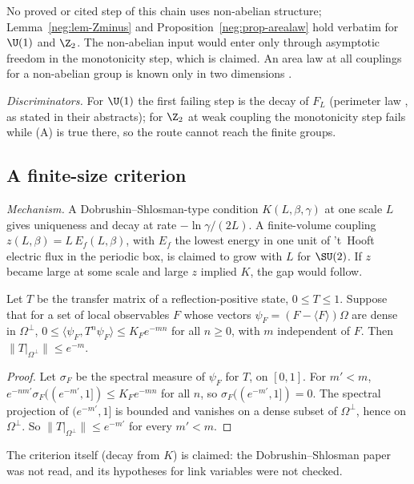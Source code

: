 No proved or cited step of this chain uses non-abelian structure; Lemma~\ref{neg:lem-Zminus}
and Proposition~\ref{neg:prop-arealaw} hold verbatim for $\U(1)$ and $\Z_2$. The non-abelian
input would enter only through asymptotic freedom in the monotonicity step, which is claimed.
An area law at all couplings for a non-abelian group is known only in two dimensions
\cite[p.~8]{Ch18}.

\emph{Discriminators.} For $\U(1)$ the first failing step is the decay of $F_L$ (perimeter law
\cite{Guth80,FS82}, as stated in their abstracts); for $\Z_2$ at weak coupling the monotonicity
step fails while (A) is true there, so the route cannot reach the finite groups.

\subsection{A finite-size criterion}\label{neg:sub-fs}

\emph{Mechanism.} A Dobrushin--Shlosman-type condition $K(L,\beta,\gamma)$ at one scale $L$
gives uniqueness and decay at rate $-\ln\gamma/(2L)$. A finite-volume coupling
$z(L,\beta)=L\,E_f(L,\beta)$, with $E_f$ the lowest energy in one unit of 't~Hooft electric flux
in the periodic box, is claimed to grow with $L$ for $\SU(2)$. If $z$ became large at some scale
and large $z$ implied $K$, the gap would follow.

\begin{lemma}\label{neg:lem-decaygap}
Let $T$ be the transfer matrix of a reflection-positive state, $0\le T\le1$. Suppose
that for a set of local observables $F$ whose vectors $\psi_F=(F-\langle F\rangle)\Omega$ are
dense in $\Omega^\perp$, $0\le\langle\psi_F,T^n\psi_F\rangle\le K_Fe^{-mn}$ for all $n\ge0$, with
$m$ independent of $F$. Then $\|T|_{\Omega^\perp}\|\le e^{-m}$.
\end{lemma}

\begin{proof}
Let $\sigma_F$ be the spectral measure of $\psi_F$ for $T$, on $[0,1]$. For $m'<m$,
$e^{-nm'}\sigma_F((e^{-m'},1])\le K_Fe^{-mn}$ for all $n$, so $\sigma_F((e^{-m'},1])=0$. The spectral
projection of $(e^{-m'},1]$ is bounded and vanishes on a dense subset of $\Omega^\perp$, hence on
$\Omega^\perp$. So $\|T|_{\Omega^\perp}\|\le e^{-m'}$ for every $m'<m$.
\end{proof}

The criterion itself (decay from $K$) is claimed: the Dobrushin--Shlosman paper was not read,
and its hypotheses for link variables were not checked.

